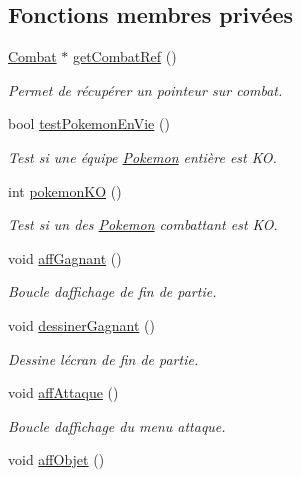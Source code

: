 \subsection*{Fonctions membres privées}
\begin{DoxyCompactItemize}
\item 
\hyperlink{class_combat}{Combat} $\ast$ \hyperlink{class_s_f_m_l_combat_a1529363beee93ae18694046822ea2e53}{get\+Combat\+Ref} ()
\begin{DoxyCompactList}\small\item\em Permet de récupérer un pointeur sur combat. \end{DoxyCompactList}\item 
bool \hyperlink{class_s_f_m_l_combat_af7ddb137c3bbaff70d2c566137c2cbb7}{test\+Pokemon\+En\+Vie} ()
\begin{DoxyCompactList}\small\item\em Test si une équipe \hyperlink{class_pokemon}{Pokemon} entière est KO. \end{DoxyCompactList}\item 
int \hyperlink{class_s_f_m_l_combat_a2665ce99eeccb4bdb1e032086a9feb04}{pokemon\+KO} ()
\begin{DoxyCompactList}\small\item\em Test si un des \hyperlink{class_pokemon}{Pokemon} combattant est KO. \end{DoxyCompactList}\item 
void \hyperlink{class_s_f_m_l_combat_ace8cd35d8b2bbc86478a7a28bf0996b4}{aff\+Gagnant} ()
\begin{DoxyCompactList}\small\item\em Boucle d\textquotesingle{}affichage de fin de partie. \end{DoxyCompactList}\item 
void \hyperlink{class_s_f_m_l_combat_aea2c9616512a2cb0c5e7e2f676a5daab}{dessiner\+Gagnant} ()
\begin{DoxyCompactList}\small\item\em Dessine l\textquotesingle{}écran de fin de partie. \end{DoxyCompactList}\item 
void \hyperlink{class_s_f_m_l_combat_a8803b5fb491ebcba31787b0aa20a9c07}{aff\+Attaque} ()
\begin{DoxyCompactList}\small\item\em Boucle d\textquotesingle{}affichage du menu attaque. \end{DoxyCompactList}\item 
void \hyperlink{class_s_f_m_l_combat_a55c6728be410efdf2ca919a9ee44728a}{aff\+Objet} ()

\end{DoxyCompactItemize}

